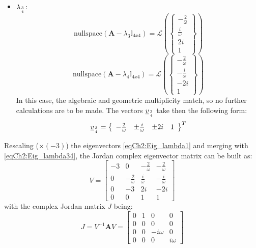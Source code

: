 \begin{itemize}
\begin{subequations}
			\end{subequations}
			\item[\GMVred{$\bullet$}] $\lambda_{3\atop 4}$:
			\[
			\text{nullspace}\left(\bm A - \lambda_{3} \mathbb{I}_{4x4}\right) =  \mathcal{L}\left( \left\{ \begin{array}{c} -\frac{2}{\omega} \\ \frac{i}{\omega} \\ 2 i \\ 1 \end{array}\right\} \right)
			\]
			\[
			\text{nullspace}\left(\bm A - \lambda_{4} \mathbb{I}_{4x4}\right) =  \mathcal{L}\left( \left\{ \begin{array}{c} -\frac{2}{\omega} \\ -\frac{i}{\omega} \\ -2 i \\ 1 \end{array}\right\} \right)
			\]
			\indent In this case, the algebraic and geometric multiplicity match, so no further calculations are to be made. The vectors $\underline{v}_{3\atop 4}$ take then the following form:
			\begin{equation}
			\label{eqCh2:Eig_lambda34}
			\underline{v}_{3\atop 4} = \left\{ \begin{array}{cccc} -\frac{2}{\omega} & \pm \frac{i}{\omega} & \pm 2 i  & 1 \end{array}\right\}^T
			\end{equation}
			\end{itemize}
			\indent Rescaling ($\times (-3)$) the eigenvectors \eqref{eqCh2:Eig_lambda1} and merging with \eqref{eqCh2:Eig_lambda34}, the Jordan complex eigenvector matrix can be built as:
			\[
			V = \left[ \begin{array}{cccc}
			-3 	& 0					& -\frac{2}{\omega}	& -\frac{2}{\omega}	 	\\
			0 	& -\frac{2}{\omega}	&  \frac{i}{\omega} & -\frac{i}{\omega} 	\\
			0 	& -3				& 2i				& -2i 					\\
			0 	& 0					& 1 				& 1
			\end{array}\right]
			\]
			\noindent with the complex Jordan matrix $J$ being:
			\begin{equation}
			J = V^{-1} \bm A V = \left[ \begin{array}{cccc}
			0 	& 1					& 0					& 0		\\
			0 	& 0					& 0 				& 0 	\\
			0 	& 0					& -i\omega			& 0 	\\
			0 	& 0					& 0 				& i\omega
			\end{array}\right]
			\label{eqCh2:Comp_lambda}
			\end{equation}
